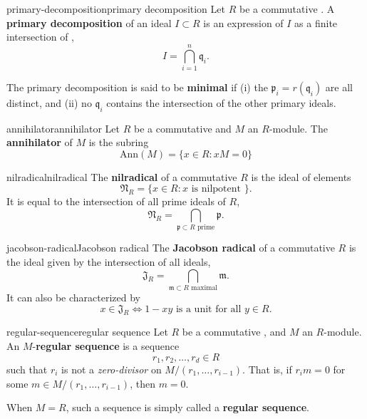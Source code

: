 \begin{topic}{primary-decomposition}{primary decomposition}
    Let $R$ be a commutative . A \textbf{primary decomposition} of an ideal $I \subset R$ is an expression of $I$ as a finite intersection of ,
    \[ I = \bigcap_{i = 1}^{n} \mathfrak{q}_i . \]
    
    The primary decomposition is said to be \textbf{minimal} if (i) the $\mathfrak{p}_i = r(\mathfrak{q}_i)$ are all distinct, and (ii) no $\mathfrak{q}_i$ contains the intersection of the other primary ideals.
\end{topic}

\begin{topic}{annihilator}{annihilator}
    Let $R$ be a commutative  and $M$ an $R$-module. The \textbf{annihilator} of $M$ is the subring
    \[ \text{Ann}(M) = \{ x \in R : xM = 0 \} \]
\end{topic}

\begin{topic}{nilradical}{nilradical}
     The \textbf{nilradical} of a commutative  $R$ is the ideal of  elements
     \[ \mathfrak{N}_R = \{ x \in R : x \text{ is nilpotent } \} . \]
     It is equal to the intersection of all prime ideals of $R$,
     \[ \mathfrak{N}_R = \bigcap_{\mathfrak{p} \subset R \text{ prime}} \mathfrak{p} . \]
\end{topic}

\begin{topic}{jacobson-radical}{Jacobson radical}
     The \textbf{Jacobson radical} of a commutative  $R$ is the ideal given by the intersection of all  ideals,
     \[ \mathfrak{J}_R = \bigcap_{\mathfrak{m} \subset R \text{ maximal}} \mathfrak{m} . \]
     It can also be characterized by
     \[ x \in \mathfrak{J}_R \iff 1 - xy \text{ is a unit for all } y \in R . \]
\end{topic}

\begin{topic}{regular-sequence}{regular sequence}
    Let $R$ be a commutative , and $M$ an $R$-module. An $M$-\textbf{regular sequence} is a sequence
    \[ r_1, r_2, \ldots, r_d \in R \]
    such that $r_i$ is not a \textit{zero-divisor} on $M/(r_1, \ldots, r_{i - 1})$. That is, if $r_i m = 0$ for some $m \in M / (r_1, \ldots, r_{i - 1})$, then $m = 0$.
    
    When $M = R$, such a sequence is simply called a \textbf{regular sequence}.
\end{topic}

